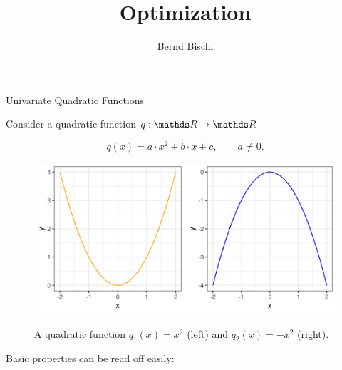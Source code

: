 





\newcommand{\titlefigure}{figure_man/hinge_vs_l2.pdf}
\newcommand{\learninggoals}{
\item Univariate Quadratic functions
\item Multivariate Quadratic functions}



\title{Optimization}
\author{Bernd Bischl}
\date{}



\sloppy

\begin{vbframe}{Univariate Quadratic Functions}

  Consider a quadratic function $q: \R \to \R$
  
  $$
    q(x) = a \cdot x^2 + b \cdot x + c, \qquad a \ne 0.
  $$
  
  
  \begin{figure}
    \includegraphics[height=0.3\textwidth, keepaspectratio]{figure_man/quadratic_functions_1D.png} \\
    \begin{footnotesize} 
    A quadratic function $q_1(x) = x^2$ (left) and $q_2(x) = - x^2$ (right). 
    \end{footnotesize}
  \end{figure}
  
  \framebreak 
  
  Basic properties can be read off easily: 
  

\end{vbframe}
